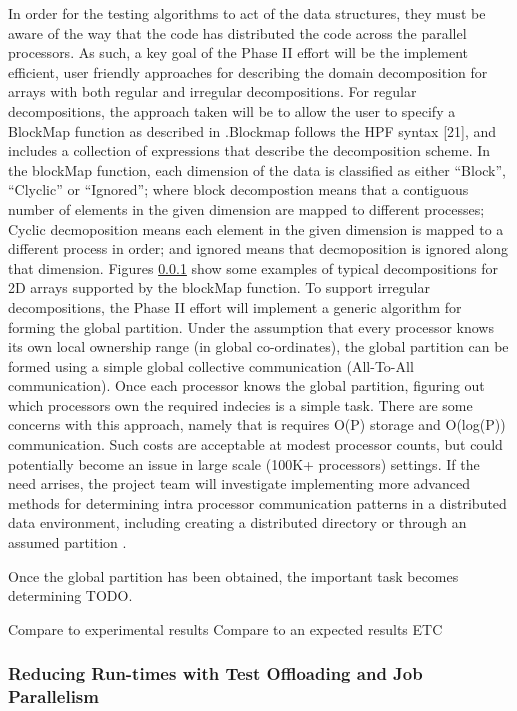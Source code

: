 In order for the testing algorithms to act of the data structures, they must be aware of the way that the code has distributed 
the code across the parallel processors. As such, a key goal of the Phase II effort will be the implement efficient, user friendly approaches for describing the domain 
decomposition for arrays with both regular and irregular decompositions. For regular decompositions, the approach taken will be to allow the user to specify a BlockMap function as described in \cite{}.Blockmap follows the HPF syntax [21], and includes a collection of expressions that describe the decomposition scheme. In the blockMap function, each dimension of the data is classified as either ``Block'', ``Clyclic'' or ``Ignored''; where block decompostion means that a contiguous number of elements in the given dimension are mapped to different processes; Cyclic decmoposition means each element in the given dimension is mapped to a different process in order; and ignored means that decmoposition is ignored along that dimension. Figures \ref{} show some examples of typical decompositions for 2D arrays supported by the blockMap function.  To support irregular decompositions, the Phase II effort will implement a generic algorithm for forming the global partition. Under the assumption that every processor knows its own local ownership range (in global co-ordinates), the global partition can be formed using a simple global collective communication (All-To-All communication). Once each processor knows the global partition, figuring out which processors own the required indecies is a simple task. There are some concerns with this approach, namely that is requires O(P) storage and O(log(P)) communication. Such costs are acceptable at modest processor counts, but could potentially become an issue in large scale (100K+ processors) settings. If the need arrises, the project team will investigate implementing more advanced methods for determining intra processor communication patterns in a distributed data environment, including creating a distributed directory \cite{hypre-ref-9} or through an assumed partition \cite{hypre-assumed-partition}. 

Once the global partition has been obtained, the important task becomes determining TODO. 

Compare to experimental results
Compare to an expected results
ETC


\subsubsection{Reducing Run-times with Test Offloading and Job Parallelism}

